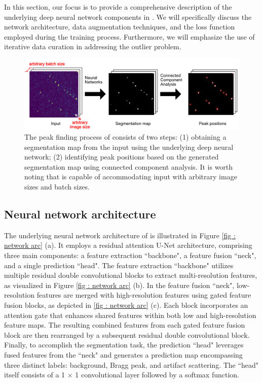 \documentclass[a4paper]{article}
\begin{document}
In this section, our focus is to provide a comprehensive description of the underlying deep neural network components in \peaknet{}.  We will specifically discuss the network architecture, data augmentation techniques, and the loss function employed during the training process.  Furthermore, we will emphasize the use of iterative data curation in addressing the outlier problem.

\begin{figure}[!ht]
\includegraphics[width=\textwidth,keepaspectratio]
{./figures/peaknet_steps.pdf}
\caption{The peak finding process of \peaknet{} consists of two steps: (1)
obtaining a segmentation map from the input using the underlying deep neural
network; (2) identifying peak positions based on the generated segmentation map
using connected component analysis.  It is worth noting that \peaknet{} is
capable of accommodating input with arbitrary image sizes and batch sizes.  }
\label{fig : peak finding}
\end{figure}


\subsection{Neural network architecture}

The underlying neural network architecture of \peaknet{} is illustrated in Figure \ref{fig : network arc} (a).  It employs a residual attention U-Net architecture, comprising three main components: a feature extraction ``backbone", a feature fusion ``neck", and a single prediction ``head".  The feature extraction ``backbone" utilizes multiple residual double convolutional blocks to extract multi-resolution features, as visualized in Figure \ref{fig : network arc} (b).  In the feature fusion ``neck", low-resolution features are merged with high-resolution features using gated feature fusion blocks, as depicted in \ref{fig : network arc} (c).  Each block incorporates an attention gate that enhances shared features within both low and high-resolution feature maps.  The resulting combined features from each gated feature fusion block are then rearranged by a subsequent residual double convolutional block.  Finally, to accomplish the segmentation task, the prediction ``head" leverages fused features from the ``neck" and generates a prediction map encompassing three distinct labels: background, Bragg peak, and artifact scattering.  The ``head" itself consists of a 1 $\times$ 1 convolutional layer followed by a softmax function.
\end{document}
